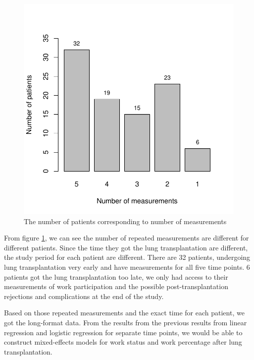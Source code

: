 \documentclass[11pt, a4paper]{article}\usepackage[]{graphicx}\usepackage[]{color}
\makeatletter
\def\maxwidth{ %
  \ifdim\Gin@nat@width>\linewidth
    \linewidth
  \else
    \Gin@nat@width
  \fi
}
\newenvironment{knitrout}{}{} %
\makeatother
\begin{document}
{\begin{figure}[ht]
\centering
\begin{knitrout}
\color{fgcolor}
\includegraphics[width=\maxwidth]{plots/pnumber_measurements-1} 

\end{knitrout}
\caption{The number of patients corresponding to number of measurements}\label{fig:fig13}
\end{figure}
 
From figure \ref{fig:fig13}, we can see the number of repeated measurements are different for different patients. Since the time they got the lung transplantation are different, the study period for each patient are different. There are 32 patients, undergoing lung transplantation very early and have measurements for all five time points. 6 patients got the lung transplantation too late, we only had access to their measurements of work participation and the possible post-transplantation rejections and complications at the end of the study.

Based on those repeated measurements and the exact time for each patient, we got the long-format data. From the results from the previous results from linear regression and logistic regression for separate time points, we would be able to construct mixed-effects models for work status and work percentage after lung transplantation.


}
\end{document}
